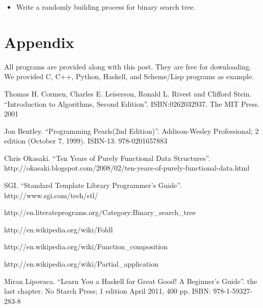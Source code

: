 \documentclass{article}
\begin{document}
\begin{Exercise}

\begin{itemize}
\item Write a randomly building process for binary search tree.
\end{itemize}

\end{Exercise}

\section{Appendix} \label{appendix}
All programs are provided along with this post. They are free for downloading.
We provided C, C++, Python, Haskell, and Scheme/Lisp programs as example.

\begin{thebibliography}{99}

Thomas H. Cormen, Charles E. Leiserson, Ronald L. Rivest and Clifford Stein.
``Introduction to Algorithms, Second Edition''. ISBN:0262032937. The MIT Press. 2001

Jon Bentley. ``Programming Pearls(2nd Edition)''. Addison-Wesley Professional; 2 edition (October 7, 1999). ISBN-13: 978-0201657883

Chris Okasaki. ``Ten Years of Purely Functional Data Structures''. http://okasaki.blogspot.com/2008/02/ten-years-of-purely-functional-data.html

SGI. ``Standard Template Library Programmer's Guide''. http://www.sgi.com/tech/stl/

http://en.literateprograms.org/Category:Binary\_search\_tree

http://en.wikipedia.org/wiki/Foldl

http://en.wikipedia.org/wiki/Function\_composition

http://en.wikipedia.org/wiki/Partial\_application

Miran Lipovaca. ``Learn You a Haskell for Great Good! A Beginner's Guide''. the last chapter. No Starch Press; 1 edition April 2011, 400 pp. ISBN: 978-1-59327-283-8

\end{thebibliography}

\ifx\wholebook\relax\else
\end{document}
